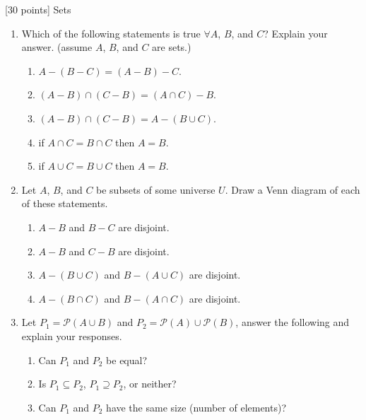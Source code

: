 [30 points] Sets\\

\vspace{0.1in}

\begin{enumerate}
    \item Which of the following statements is true \(\forall A\), \(B\), and \(C\)?
    Explain your answer. 
     (assume \(A\), \(B\), and \(C\) are sets.)
    \begin{enumerate}
        \item \(A - (B - C) = (A - B) - C\).
        \item \((A - B) \cap (C - B) = (A \cap C) - B\).
        \item \((A - B) \cap (C - B) = A - (B \cup C)\).
        \item if \(A \cap C = B \cap C\) then \(A = B\).
        \item if \(A \cup C = B \cup C\) then \(A = B\).\\
    \end{enumerate}

    \item Let \(A\), \(B\), and \(C\) be subsets of some universe \(U\). 
    Draw a Venn diagram of each of these statements.
    \begin{enumerate}
        \item \(A - B\) and \(B - C\) are disjoint.
        \item \(A - B\) and \(C - B\) are disjoint.
        \item \(A - (B \cup C)\) and \(B - (A \cup C)\) are disjoint.
        \item \(A - (B \cap C)\) and \(B - (A \cap C)\) are disjoint.\\
    \end{enumerate}
    
    \item Let \(P_1 = \mathscr{P}(A \cup B)\) and \(P_2 = \mathscr{P}(A)\cup \mathscr{P}(B)\), 
    answer the following and explain your responses. 
    	\begin{enumerate}
	\item Can $P_1$ and $P_2$ be equal? 
	\item Is $P_1 \subseteq P_2$, $P_1 \supseteq P_2$, or neither?  
	\item Can $P_1$ and $P_2$ have the same size (number of elements)?
	\end{enumerate}

\end{enumerate}

